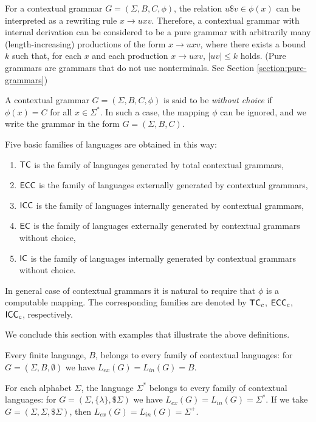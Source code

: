 For a contextual grammar $G = (\Sigma, B, C, \phi)$, the relation $u \$ v \in \phi(x)$
can be interpreted as a rewriting rule $x \to u x v$. Therefore, a contextual grammar
with internal derivation can be considered to be a pure grammar 
with arbitrarily many (length-increasing) productions of the form $x \to u x v$, where 
there exists a bound $k$ such that, for each $x$ and each production $x \to u x v$, 
$|uv| \le k$ holds. (Pure grammars are grammars that do not use nonterminals. 
See Section \ref{section:pure-grammars})

A contextual grammar $G = (\Sigma, B, C, \phi)$ is said to be 
\emph{without choice}
if $\phi(x) = C$ for all $x \in \Sigma^*$. In such a case, the mapping $\phi$ can
be ignored, and we write the grammar in the form $G = (\Sigma, B, C)$.

Five basic families of languages are obtained in this way:

\begin{enumerate}
\item \index{$\TC$}$\TC$ is the family of languages generated by 
total contextual grammars,
\item \index{$\ECC$}$\ECC$ is the family of languages externally generated by 
contextual grammars,
\item \index{$\ICC$}$\ICC$ is the family of languages internally generated by 
contextual grammars,
\item \index{$\EC$}$\EC$ is the family of languages externally generated by 
contextual grammars without choice,
\item \index{$\IC$}$\IC$ is the family of languages internally generated by 
contextual grammars without choice.
\end{enumerate}

In general case of contextual grammars it is natural to require that $\phi$ is
a computable mapping. The corresponding families are denoted by $\textup{\sf TC}_c$,
$\textup{\sf ECC}_c$, $\textup{\sf ICC}_c$, respectively.

We conclude this section with examples that illustrate the above definitions.

\begin{example}
Every finite language, $B$, belongs to every family of contextual languages:
for $G = (\Sigma, B, \emptyset)$ we have $L_{ex}(G) = L_{in}(G) = B$.
\end{example}

\begin{example}
For each alphabet $\Sigma$, the language $\Sigma^*$ belongs to every family
of contextual languages: for $G = (\Sigma, \{\lambda\}, \$ \Sigma)$ we have
$L_{ex}(G) = L_{in}(G) = \Sigma^*$.
If we take $G = (\Sigma, \Sigma, \$ \Sigma)$, then $L_{ex}(G) = L_{in}(G) = \Sigma^+$.
\end{example}

